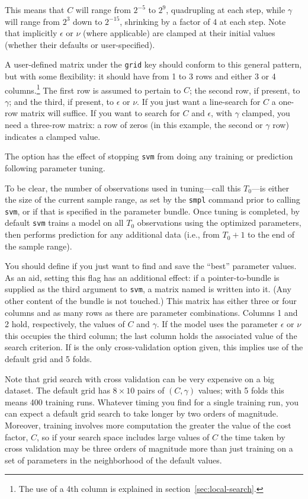 \documentclass{article}
\begin{document}
This means that $C$ will range from $2^{-5}$ to $2^9$, quadrupling at
each step, while $\gamma$ will range from $2^3$ down to $2^{-15}$,
shrinking by a factor of 4 at each step. Note that implicitly
$\epsilon$ or $\nu$ (where applicable) are clamped at their initial
values (whether their defaults or user-specified).

A user-defined matrix under the \texttt{grid} key should conform to
this general pattern, but with some flexibility: it should have from 1
to 3 rows and either 3 or 4 columns.\footnote{The use of a 4th column
  is explained in section~\ref{sec:local-search}.} The first row is
assumed to pertain to $C$; the second row, if present, to $\gamma$;
and the third, if present, to $\epsilon$ or $\nu$. If you just want a
line-search for $C$ a one-row matrix will suffice.  If you want to
search for $C$ and $\epsilon$, with $\gamma$ clamped, you need a
three-row matrix: a row of zeros (in this example, the second or
$\gamma$ row) indicates a clamped value.

The  option has the effect of stopping
\texttt{svm} from doing any training or prediction following parameter
tuning.

To be clear, the number of observations used in tuning---call this
$T_0$---is either the size of the current sample range, as set by the
\texttt{smpl} command prior to calling \texttt{svm}, or
 if that is specified in the parameter bundle. Once
tuning is completed, by default \texttt{svm} trains a model on all
$T_0$ observations using the optimized parameters, then performs
prediction for any additional data (i.e., from $T_0 + 1$ to the end of
the sample range).

You should define  if you just want to find and
save the ``best'' parameter values. As an aid, setting this flag has
an additional effect: if a pointer-to-bundle is supplied as the third
argument to \texttt{svm}, a matrix named  is
written into it. (Any other content of the bundle is not touched.)
This matrix has either three or four columns and as many rows as there
are parameter combinations. Columns 1 and 2 hold, respectively, the
values of $C$ and $\gamma$.  If the model uses the parameter
$\epsilon$ or $\nu$ this occupies the third column; the last column
holds the associated value of the search criterion.  If
 is the only cross-validation option given, this
implies use of the default grid and 5 folds.

Note that grid search with cross validation can be very expensive on a
big dataset. The default grid has $8 \times 10$ pairs of $(C, \gamma)$
values; with 5 folds this means 400 training runs. Whatever timing you
find for a single training run, you can expect a default grid search
to take longer by two orders of magnitude. Moreover, training involves
more computation the greater the value of the cost factor, $C$, so if
your search space includes large values of $C$ the time taken by cross
validation may be three orders of magnitude more than just training on
a set of parameters in the neighborhood of the default values.
\end{document}

